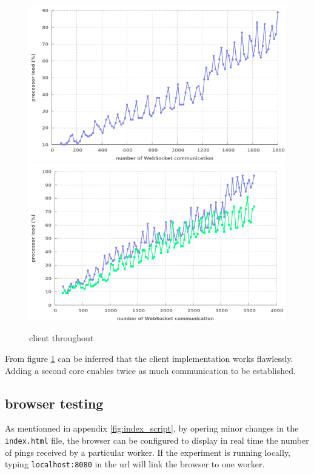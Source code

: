\begin{figure}[H]
	\centering
		\includegraphics[width=\textwidth]{./Figures/1_client.png}
		\includegraphics[width=\textwidth]{./Figures/2_client.png}
	\caption[1+2_client]{client throughout}
	\label{fig:1+2_client}
\end{figure}


From figure \ref{fig:1+2_client} can be inferred that the client
implementation works flawlessly. Adding a second core enables twice as much
communication  to be established.

\subsection{browser testing}

As mentionned in appendix \ref{fig:index_script}, by opering minor changes in
the \texttt{index.html} file, the browser can be configured to display in real
time the number of pings received by a particular worker. If the experiment is
running locally, typing \texttt{localhost:8080} in the url will link the
browser to one worker.\\

